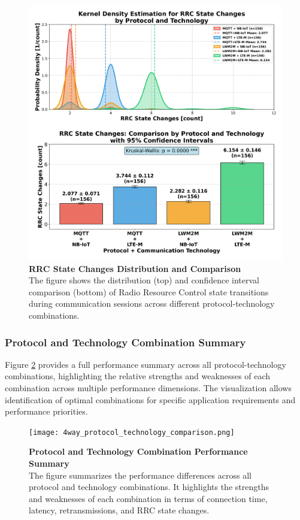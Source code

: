 \documentclass[12pt, english, openany]{book}
\begin{document}
\begin{figure}[htbp]
    \centering
    \includegraphics[width=1.0\textwidth]{rrc_state_changes_all_protocol_tech_kde_ci.png}
    \caption{\textbf{RRC State Changes Distribution and Comparison} \\ The figure shows the distribution (top) and confidence interval comparison (bottom) of Radio Resource Control state transitions during communication sessions across different protocol-technology combinations.}
    \label{fig:rrc_state_changes_all}
\end{figure}
\FloatBarrier
\subsubsection*{Protocol and Technology Combination Summary} \label{sec:protocol_technology_combination_summary}

Figure \ref{fig:protocol_technology_combination_summary} provides a full performance summary across all protocol-technology combinations, highlighting the relative strengths and weaknesses of each combination across multiple performance dimensions. The visualization allows identification of optimal combinations for specific application requirements and performance priorities.

\begin{figure}[htbp]
    \centering
    \texttt{[image: 4way\_protocol\_technology\_comparison.png]}
    \caption{\textbf{Protocol and Technology Combination Performance Summary} \\ The figure summarizes the performance differences across all protocol and technology combinations. It highlights the strengths and weaknesses of each combination in terms of connection time, latency, retransmissions, and RRC state changes.}
    \label{fig:protocol_technology_combination_summary}
\end{figure}
\end{document}
